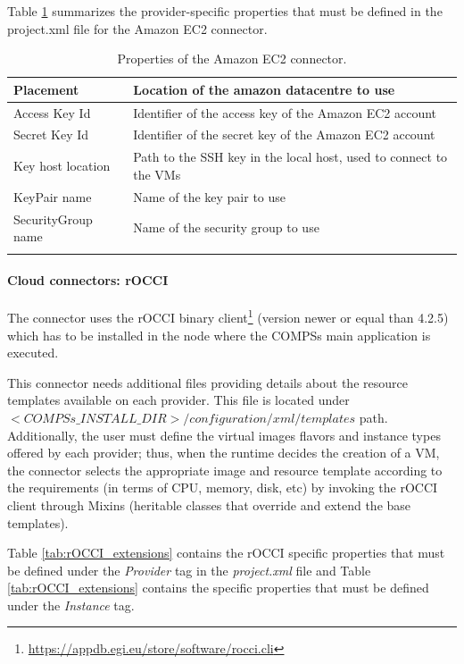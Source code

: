 Table \ref{tab:ec2_connector_properties} summarizes the provider-specific properties that must be 
defined in the project.xml file for the Amazon EC2 connector.
\bgroup
  \def\arraystretch{1.5}
  \begin{longtable}{| p{} | p{} |}
  \hline
  \textbf{Placement}  &   Location of the amazon datacentre to use \\ \hline
  Access Key Id       &   Identifier of the access key of the Amazon EC2 account \\ \hline
  Secret Key Id       &   Identifier of the secret key of the Amazon EC2 account \\ \hline
  Key host location   &   Path to the SSH key in the local host, used to connect to the VMs \\ \hline
  KeyPair name        &   Name of the key pair to use \\ \hline
  SecurityGroup name  &   Name of the security group to use \\ \hline
  
  \caption{Properties of the Amazon EC2 connector.}
  \label{tab:ec2_connector_properties}
  \end{longtable}
\egroup

\paragraph{Cloud connectors: rOCCI}
The connector uses the rOCCI binary client\footnote{\url{https://appdb.egi.eu/store/software/rocci.cli}} 
(version newer or equal than 4.2.5) which has to be installed in the node where the COMPSs main 
application is executed.

This connector needs additional files providing details about the resource templates available on 
each provider. This file is located under $<COMPSs\_INSTALL\_DIR>/configuration/xml/templates$ path.
Additionally, the user must define the virtual images flavors and instance types offered by each provider; 
thus, when the runtime decides the creation of a VM, the connector selects the appropriate image and 
resource template according to the requirements (in terms of CPU, memory, disk, etc) by invoking the 
rOCCI client through Mixins (heritable classes that override and extend the base templates).

Table \ref{tab:rOCCI_extensions} contains the rOCCI specific properties that must be defined under the \textit{Provider} tag in
the \textit{project.xml} file and Table \ref{tab:rOCCI_extensions} contains the specific properties that must be defined
under the \textit{Instance} tag.

